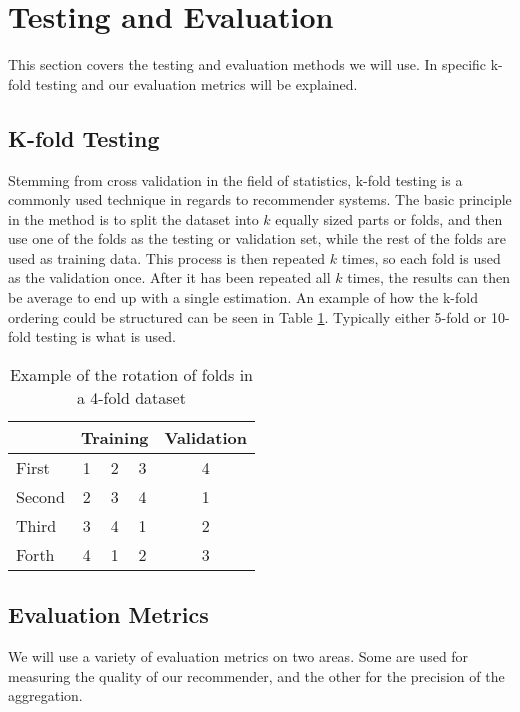 \section{Testing and Evaluation}
This section covers the testing and evaluation methods we will use. In specific k-fold testing and our evaluation metrics will be explained.

\subsection{K-fold Testing}
Stemming from cross validation in the field of statistics, k-fold testing is a commonly used technique in regards to recommender systems. The basic principle in the method is to split the dataset into $k$ equally sized parts or folds, and then use one of the folds as the testing or validation set, while the rest of the folds are used as training data. This process is then repeated $k$ times, so each fold is used as the validation once. After it has been repeated all $k$ times, the results can then be average to end up with a single estimation. An example of how the k-fold ordering could be structured can be seen in Table \ref{tbl:bg_k-fold}. Typically either 5-fold or 10-fold testing is what is used.

\begin{table}[H]
	\centering
	\begin{tabular}{|l|c|c|c|c|}
		\hline
		& \multicolumn{3}{l|}{Training} & \multicolumn{1}{l|}{Validation} \\ \hline
		First  & 1        & 2        & 3       & 4                               \\ \hline
		Second & 2        & 3        & 4       & 1                               \\ \hline
		Third  & 3        & 4        & 1       & 2                               \\ \hline
		Forth  & 4        & 1        & 2       & 3                               \\ \hline
	\end{tabular}
	\caption{Example of the rotation of folds in a 4-fold dataset}
	\label{tbl:bg_k-fold}
\end{table}

\subsection{Evaluation Metrics}
We will use a variety of evaluation metrics on two areas. Some are used for measuring the quality of our recommender, and the other for the precision of the aggregation.

